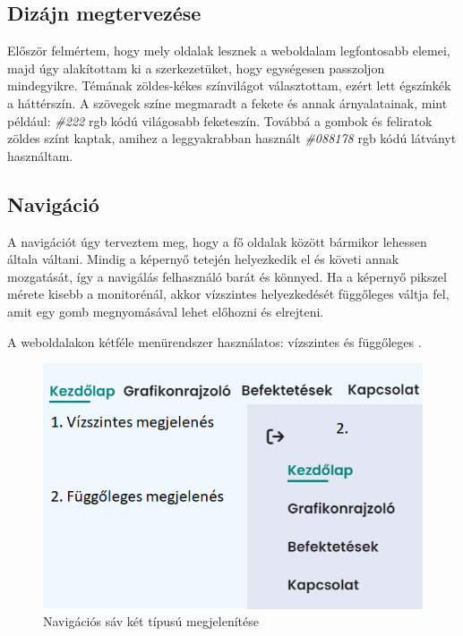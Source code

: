 \subsection{Dizájn megtervezése}

Először felmértem, hogy mely oldalak lesznek a weboldalam legfontosabb elemei, majd úgy alakítottam ki a szerkezetüket, hogy egységesen passzoljon mindegyikre. Témának zöldes-kékes színvilágot választottam, ezért lett égszínkék a háttérszín. A szövegek színe megmaradt a fekete és annak árnyalatainak, mint például: \emph{\#222} rgb kódú világosabb feketeszín. Továbbá a gombok és feliratok zöldes színt kaptak, amihez a leggyakrabban használt \emph{\#088178} rgb kódú látványt használtam.

\subsection{Navigáció}

A navigációt úgy terveztem meg, hogy a fő oldalak között bármikor lehessen általa váltani. Mindig a képernyő tetején helyezkedik el és követi annak mozgatását, így a navigálás felhasználó barát és könnyed. Ha a képernyő pikszel mérete kisebb a monitorénál, akkor vízszintes helyezkedését függőleges váltja fel, amit egy gomb megnyomásával lehet előhozni és elrejteni.

	A weboldalakon kétféle menürendszer használatos: vízszintes és függőleges . 

\begin{figure}[h]
\centering
\includegraphics[scale=0.5]{images/navbar.png}
\caption{Navigációs sáv két típusú megjelenítése}
\label{fig:navbar}
\end{figure}

